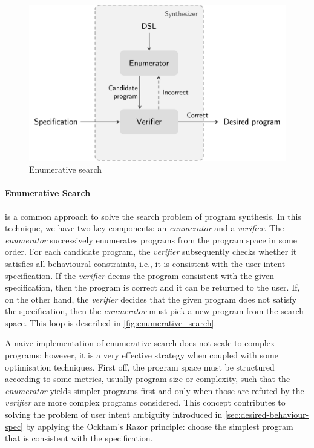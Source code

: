 \begin{figure}
    \centering
    \includegraphics[scale=.35]{pictures/enumerative_search.pdf}
    \caption{Enumerative search}
    \label{fig:enumerative_search}
\end{figure}

\paragraph{Enumerative Search}\label{sec:enum-search}
\cite{DBLP:conf/pldi/FengMGDC17,DBLP:conf/pldi/FengMBD18,AlphaRegex16,Orvalho19,DBLP:conf/cav/ReynoldsBNBT19} is a common approach to solve the search problem of program synthesis. In this technique, we have two key components: an \textit{enumerator} and a \textit{verifier}.
The \textit{enumerator} successively enumerates programs from the program space in some order. For each candidate program, the \textit{verifier} subsequently checks whether it satisfies all behavioural constraints, i.e., it is consistent with the user intent specification.
If the \textit{verifier} deems the program consistent with the given specification, then the program is correct and it can be returned to the user.
If, on the other hand, the \textit{verifier} decides that the given program does not satisfy the specification, then the \textit{enumerator} must pick a new program from the search space.
This loop is described in \autoref{fig:enumerative_search}.

A naive implementation of enumerative search does not scale to complex programs; however, it is a very effective strategy when coupled with some optimisation techniques. First off, the program space must be structured according to some metrics, usually program size or complexity, such that the \textit{enumerator} yields simpler programs first and only when those are refuted by the \textit{verifier} are more complex programs considered. This concept contributes to solving the problem of user intent ambiguity introduced in \autoref{sec:desired-behaviour-spec} by applying the Ockham's Razor principle: choose the simplest program that is consistent with the specification.

